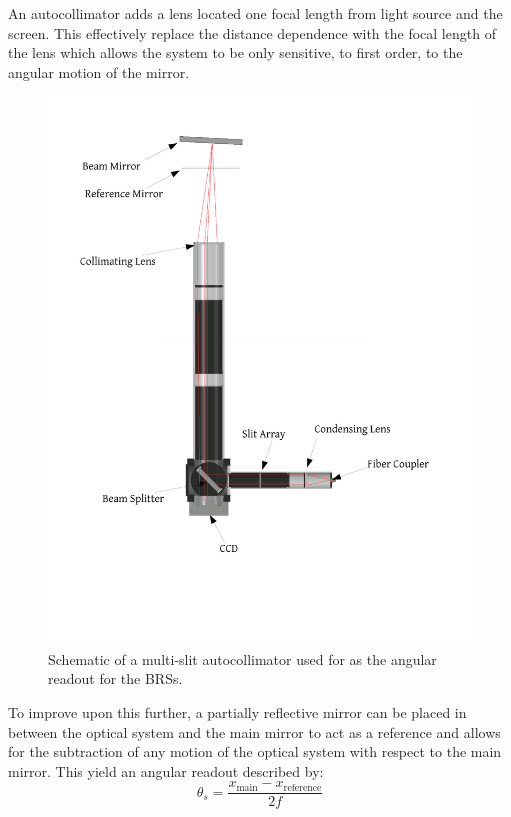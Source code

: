 \documentclass [12pt, proquest]{uwthesis}[2019]
\begin{document}
An autocollimator adds a lens located one focal length from light source and the screen. This effectively replace the distance dependence with the focal length of the lens which allows the system to be only sensitive, to first order, to the angular motion of the mirror.

\begin{figure}%
\begin{center}
 \includegraphics[width=\textwidth]{Autocollimator.pdf}
\caption[Schematic of a multi-slit autocollimator]{Schematic of a multi-slit autocollimator used for as the angular readout for the BRSs.}
\label{ACFig}
\end{center}
\end{figure}

To improve upon this further, a partially reflective mirror can be placed in between the optical system and the main mirror to act as a reference and allows for the subtraction of any motion of the optical system with respect to the main mirror. This yield an angular readout described by:
\begin{equation}
\theta_{s}=\frac{x_{\text{main}}-x_{\text{reference}}}{2f}
\label{ACEq}
\end{equation}
\end{document}
